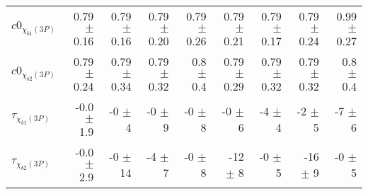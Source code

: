 \begin{table}[H]
{\begin{tabular}{lrrrrrrrr}
\rule{0pt}{4ex}$c0_{\chi_{b1}(3P)}$ & 0.79 $\pm$ 0.16 & 0.79 $\pm$ 0.16 & 0.79 $\pm$ 0.20 & 0.79 $\pm$ 0.26 & 0.79 $\pm$ 0.21 & 0.79 $\pm$ 0.17 & 0.79 $\pm$ 0.24 & 0.99 $\pm$ 0.27\\
$c0_{\chi_{b2}(3P)}$ & 0.79 $\pm$ 0.24 & 0.79 $\pm$ 0.34 & 0.79 $\pm$ 0.32 & 0.8 $\pm$ 0.4 & 0.79 $\pm$ 0.29 & 0.79 $\pm$ 0.32 & 0.79 $\pm$ 0.32 & 0.8 $\pm$ 0.4\\

\rule{0pt}{4ex}$\tau_{\chi_{b1}(3P)}$ & -0.0 $\pm$ 1.9 & -0 $\pm$ 4 & -0 $\pm$ 9 & -0 $\pm$ 8 & -0 $\pm$ 6 & -4 $\pm$ 4 & -2 $\pm$ 5 & -7 $\pm$ 6\\
$\tau_{\chi_{b2}(3P)}$ & -0.0 $\pm$ 2.9 & -0 $\pm$ 14 & -4 $\pm$ 7 & -0 $\pm$ 8 & -12 $\pm$ 8 & -0 $\pm$ 5 & -16 $\pm$ 9 & -0 $\pm$ 5\\
\bottomrule
\end{tabular}
} %
\label{tab:mc:chib3p_ups3s:fits}
\end{table}
